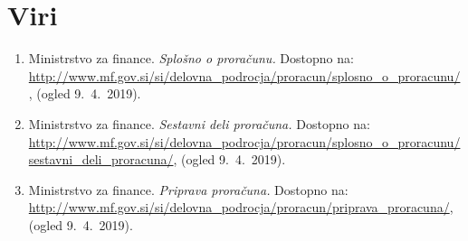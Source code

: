 \documentclass[12pt, a4paper]{article}
\begin{document}
\section[Viri]{Viri}
\begin{enumerate}
\item
\label{Splošno o proračunu}
Ministrstvo za finance. \emph{Splošno o proračunu.} Dostopno na: \url{http://www.mf.gov.si/si/delovna_podrocja/proracun/splosno_o_proracunu/},  (ogled 9.~4.~2019).

\item
\label{Sestavni deli}
Ministrstvo za finance. \emph{Sestavni deli proračuna.} Dostopno na: \url{http://www.mf.gov.si/si/delovna_podrocja/proracun/splosno_o_proracunu/sestavni_deli_proracuna/}, (ogled 9.~4.~2019).

\item
\label{Priprava proračuna}
Ministrstvo za finance. \emph{Priprava proračuna.} Dostopno na: \url{http://www.mf.gov.si/si/delovna_podrocja/proracun/priprava_proracuna/}, (ogled 9.~4.~2019).
\end{enumerate}
\end{document}
